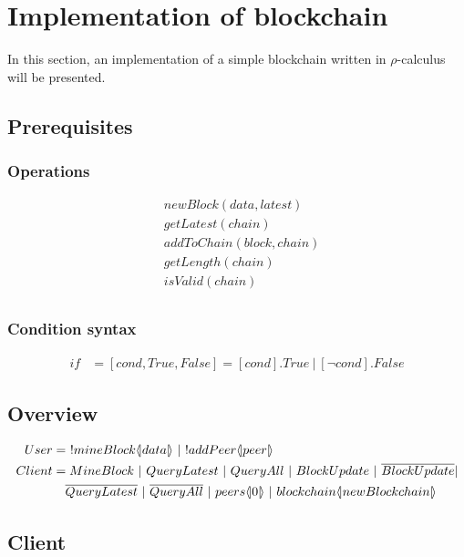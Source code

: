 \section{Implementation of blockchain}
In this section, an implementation of a simple blockchain written in $\rho$-calculus will be presented.

\subsection{Prerequisites}

\subsubsection{Operations}

\begin{align*}
    &newBlock(data,latest)\\
    &getLatest(chain)\\
    &addToChain(block,chain)\\
    &getLength(chain)\\
    &isValid(chain)\\
\end{align*}

\subsubsection{Condition syntax}

\begin{align*}
    if &= [cond,True,False] = [cond].True\ |\ [\neg cond].False
\end{align*}

\subsection{Overview}


\begin{align*}
    User &=\ !mineBlock \lift{}{data}\ |\ !addPeer\lift{}{peer}\\
    Client &= MineBlock\ |\ QueryLatest\ |\ QueryAll\ |\ BlockUpdate\ |\ \overline{BlockUpdate}|\\
    &\quad \overline{QueryLatest}\ |\ \overline{QueryAll}\ |\ peers\lift{}{0}\ |\ blockchain\lift{}{newBlockchain}
\end{align*}

\subsection{Client}

